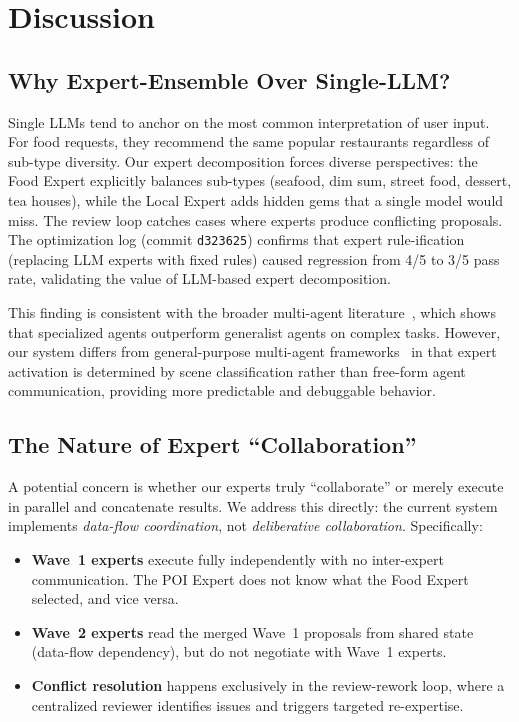 \section{Discussion}
\label{sec:discussion}

\subsection{Why Expert-Ensemble Over Single-LLM?}

Single LLMs tend to anchor on the most common interpretation of user input. For food requests, they recommend the same popular restaurants regardless of sub-type diversity. Our expert decomposition forces diverse perspectives: the Food Expert explicitly balances sub-types (seafood, dim sum, street food, dessert, tea houses), while the Local Expert adds hidden gems that a single model would miss. The review loop catches cases where experts produce conflicting proposals. The optimization log (commit \texttt{d323625}) confirms that expert rule-ification (replacing LLM experts with fixed rules) caused regression from 4/5 to 3/5 pass rate, validating the value of LLM-based expert decomposition.

This finding is consistent with the broader multi-agent literature~\cite{tran2025multiagent}, which shows that specialized agents outperform generalist agents on complex tasks. However, our system differs from general-purpose multi-agent frameworks~\cite{wu2023autogen,crewai2024} in that expert activation is determined by scene classification rather than free-form agent communication, providing more predictable and debuggable behavior.

\subsection{The Nature of Expert ``Collaboration''}

A potential concern is whether our experts truly ``collaborate'' or merely execute in parallel and concatenate results. We address this directly: the current system implements \textit{data-flow coordination}, not \textit{deliberative collaboration}. Specifically:

\begin{itemize}[leftmargin=*]
    \item \textbf{Wave~1 experts} execute fully independently with no inter-expert communication. The POI Expert does not know what the Food Expert selected, and vice versa.
    \item \textbf{Wave~2 experts} read the merged Wave~1 proposals from shared state (data-flow dependency), but do not negotiate with Wave~1 experts.
    \item \textbf{Conflict resolution} happens exclusively in the review-rework loop, where a centralized reviewer identifies issues and triggers targeted re-expertise.
\end{itemize}

